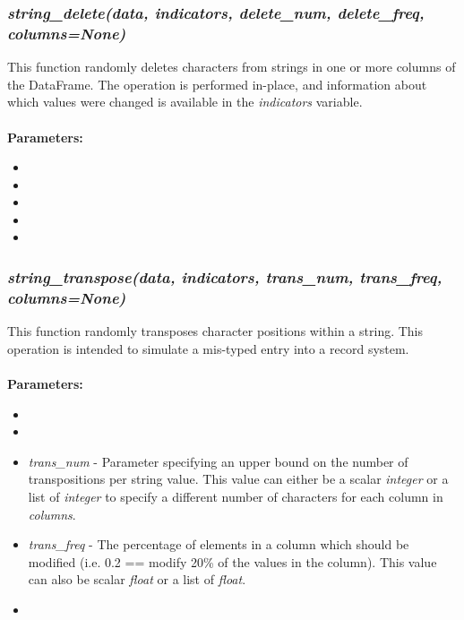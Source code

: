 \documentclass[titlepage, 11pt]{article}
\begin{document}
\subsubsection{\textit{string\_delete(data, indicators, delete\_num, delete\_freq, columns=None)}}

This function randomly deletes characters from strings in one or more columns of the DataFrame. The operation is performed in-place, and information about which values were changed is available in the \textit{indicators} variable.
\\
\\
\textbf{Parameters:}
\begin{itemize}
    \item \docdata
    \item \docindc
    \item {}
    \item  {}
    \item \doccols
\end{itemize}

 
\subsubsection{\textit{string\_transpose(data, indicators, trans\_num, trans\_freq, columns=None)}}
This function randomly transposes character positions within a string. This operation is intended to simulate a mis-typed entry into a record system.
\\
\\
\textbf{Parameters:}
\begin{itemize}
    \item \docdata
    \item \docindc
    \item \textit{trans\_num} - Parameter specifying an upper bound on the number of transpositions per string value. This value can either be a scalar \textit{integer} or a list of \textit{integer} to specify a different number of characters for each column in \textit{columns}.
    \item \textit{trans\_freq} - The percentage of elements in a column which should be modified (i.e. 0.2 == modify 20\% of the values in the column). This value can also be scalar \textit{float} or a list of \textit{float}.
    \item \doccols
\end{itemize}
\end{document}
